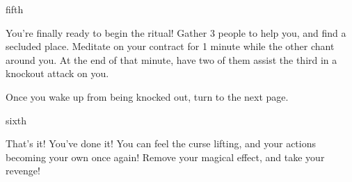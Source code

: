 \documentclass[greennotebook]{NeptuneBall}
\begin{document}
\begin{page}{fifth}

You're finally ready to begin the ritual! Gather 3 people to help you, and find a secluded place. Meditate on your contract for 1 minute while the other chant around you. At the end of that minute, have two of them assist the third in a knockout attack on you.

Once you wake up from being knocked out, turn to the next page.

\end{page}

\begin{page}{sixth}

That's it! You've done it! You can feel the curse lifting, and your actions becoming your own once again! Remove your \iIdentityProtectionSpell{} magical effect, and take your revenge!

\end{page}

\endnotebook
\end{document}
